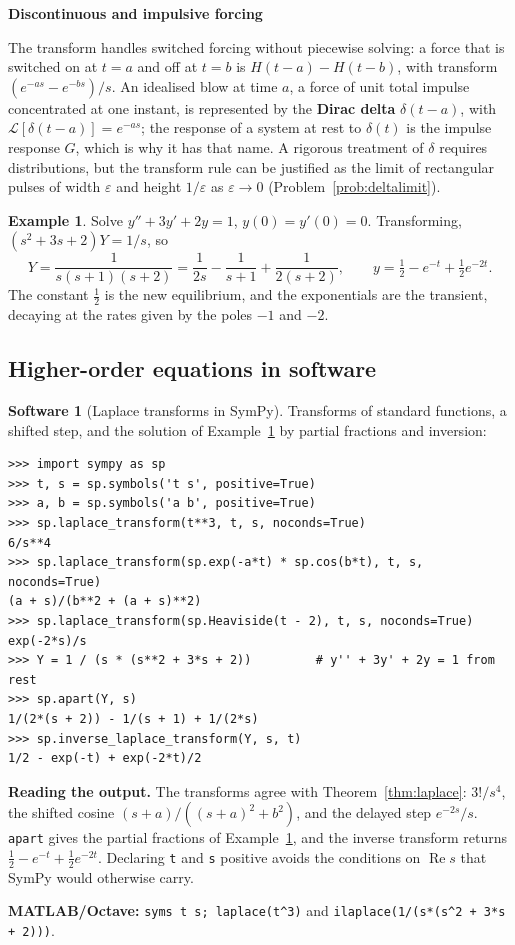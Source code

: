 \documentclass[11pt,a4paper]{article}
\numberwithin{equation}{section}
\DeclareMathOperator{\Real}{Re}
\theoremstyle{definition}
\newtheorem{exa}[thm]{Example}
\newtheorem{software}[thm]{Software}
\newcommand{\subhead}[1]{%
  \par\medskip\noindent\textbf{#1}\par\nobreak\smallskip}
\begin{document}
\subhead{Discontinuous and impulsive forcing}
The transform handles switched forcing without piecewise solving: a force that is switched on at $t = a$ and off at $t = b$ is $H(t - a) - H(t - b)$, with transform $(e^{-as} - e^{-bs})/s$. An
idealised blow at time $a$, a force of unit total impulse concentrated at one instant, is represented by the \textbf{Dirac delta} $\delta(t - a)$, with $\mathcal L[\delta(t - a)] = e^{-as}$; the
response of a system at rest to $\delta(t)$ is the impulse response $G$, which is why it has that name. A rigorous treatment of $\delta$ requires distributions, but the transform rule can
be justified as the limit of rectangular pulses of width $\varepsilon$ and height $1/\varepsilon$ as $\varepsilon \to 0$ (Problem~\ref{prob:deltalimit}).

\begin{exa}
\label{ex:laplaceivp}
Solve $y'' + 3y' + 2y = 1$, $y(0) = y'(0) = 0$. Transforming, $(s^2 + 3s + 2)Y = 1/s$, so
\[
Y = \frac{1}{s(s + 1)(s + 2)} = \frac{1}{2s} - \frac{1}{s + 1} + \frac{1}{2(s + 2)}, \qquad y = \tfrac12 - e^{-t} + \tfrac12e^{-2t} .
\]
The constant $\frac12$ is the new equilibrium, and the exponentials are the transient, decaying at the rates given by the poles $-1$ and $-2$.
\end{exa}

\subsection{Higher-order equations in software}
\label{ssec:software6}

\begin{software}[Laplace transforms in SymPy]
\label{sw:laplace}
Transforms of standard functions, a shifted step, and the solution of Example~\ref{ex:laplaceivp} by partial fractions and inversion:
{\small\begin{verbatim}
>>> import sympy as sp
>>> t, s = sp.symbols('t s', positive=True)
>>> a, b = sp.symbols('a b', positive=True)
>>> sp.laplace_transform(t**3, t, s, noconds=True)
6/s**4
>>> sp.laplace_transform(sp.exp(-a*t) * sp.cos(b*t), t, s, noconds=True)
(a + s)/(b**2 + (a + s)**2)
>>> sp.laplace_transform(sp.Heaviside(t - 2), t, s, noconds=True)
exp(-2*s)/s
>>> Y = 1 / (s * (s**2 + 3*s + 2))         # y'' + 3y' + 2y = 1 from rest
>>> sp.apart(Y, s)
1/(2*(s + 2)) - 1/(s + 1) + 1/(2*s)
>>> sp.inverse_laplace_transform(Y, s, t)
1/2 - exp(-t) + exp(-2*t)/2
\end{verbatim}}
\textbf{Reading the output.} The transforms agree with Theorem~\ref{thm:laplace}: $3!/s^4$, the shifted cosine $(s + a)/((s + a)^2 + b^2)$, and the delayed step $e^{-2s}/s$. \texttt{apart} gives the partial fractions
of Example~\ref{ex:laplaceivp}, and the inverse transform returns $\frac12 - e^{-t} + \frac12e^{-2t}$. Declaring \texttt{t} and \texttt{s} positive avoids the conditions on $\Real s$ that SymPy would otherwise carry.

\textbf{MATLAB/Octave:} \texttt{syms t s; laplace(t\^{}3)} and \texttt{ilaplace(1/(s*(s\^{}2 + 3*s + 2)))}.
\end{software}
\end{document}
